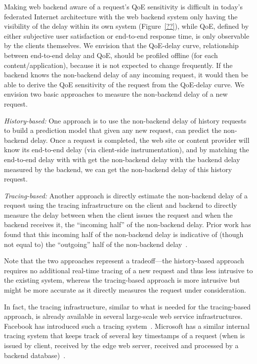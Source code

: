 Making web backend aware of a request's QoE sensitivity is difficult in today's federated Internet architecture with the web backend system only having the visibility of the delay within its own system (Figure~\ref{??}), while QoE, defined by either subjective user satisfaction or end-to-end response time, is only observable by the clients themselves. 
We envision that the QoE-delay curve, \ie relationship between end-to-end delay and QoE, should be profiled offline (for each content/application), because it is not expected to change frequently.
If the backend knows the non-backend delay of any incoming request, it would then be able to derive the QoE sensitivity of the request from the QoE-delay curve. 
We envision two basic approaches to measure the non-backend delay of a new request. 
\begin{packeditemize}
\item {\em History-based:}
One approach is to use the non-backend delay of history requests to build a prediction model that given any new request, can predict the non-backend delay. Once a request is completed, the web site or content provider will know its end-to-end delay (\eg via client-side instrumentation), and by matching the end-to-end delay with with get the non-backend delay with the backend delay measured by the backend, we can get the non-backend delay of this history request.

\item {\em Tracing-based:}
Another approach is directly estimate the non-backend delay of a request using the tracing infrastructure on the client and backend to directly measure the delay between when the client issues the request and when the backend receives it, \ie the ``incoming half'' of the non-backend delay. Prior work has found that this incoming half of the non-backend delay is indicative of (though not equal to) the ``outgoing'' half of the non-backend delay~\cite{timecard}.
\end{packeditemize}
Note that the two approaches represent a tradeoff---the history-based approach requires no additional real-time tracing of a new request and thus less intrusive to the existing system, whereas the tracing-based approach is more intrusive but might be more accurate as it directly measures the request under consideration.

In fact, the tracing infrastructure, similar to what is needed for the tracing-based approach, is already available in several large-scale web service infrastructures. Facebook has introduced such a tracing system~\cite{mysterymachine}. Microsoft has a similar internal tracing system that keeps track of several key timestamps of a request (\eg when is issued by client, received by the edge web server, received and processed by a backend database)~\cite{sid's paper}.

